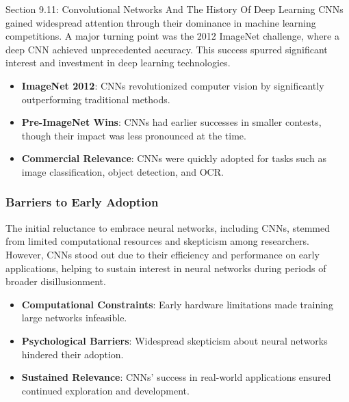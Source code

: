 \begin{notes}{Section 9.11: Convolutional Networks And The History Of Deep Learning}
    CNNs gained widespread attention through their dominance in machine learning competitions. A major turning point was the 2012 ImageNet challenge, where a deep CNN achieved unprecedented accuracy. This 
    success spurred significant interest and investment in deep learning technologies.
    
    \begin{highlight}
        \begin{itemize}
            \item \textbf{ImageNet 2012}: CNNs revolutionized computer vision by significantly outperforming traditional methods.
            \item \textbf{Pre-ImageNet Wins}: CNNs had earlier successes in smaller contests, though their impact was less pronounced at the time.
            \item \textbf{Commercial Relevance}: CNNs were quickly adopted for tasks such as image classification, object detection, and OCR.
        \end{itemize}
    \end{highlight}
    
    \subsubsection*{Barriers to Early Adoption}
    
    The initial reluctance to embrace neural networks, including CNNs, stemmed from limited computational resources and skepticism among researchers. However, CNNs stood out due to their efficiency and 
    performance on early applications, helping to sustain interest in neural networks during periods of broader disillusionment.
    
    \begin{highlight}
        \begin{itemize}
            \item \textbf{Computational Constraints}: Early hardware limitations made training large networks infeasible.
            \item \textbf{Psychological Barriers}: Widespread skepticism about neural networks hindered their adoption.
            \item \textbf{Sustained Relevance}: CNNs' success in real-world applications ensured continued exploration and development.
        \end{itemize}
    \end{highlight}
    

\end{notes}

